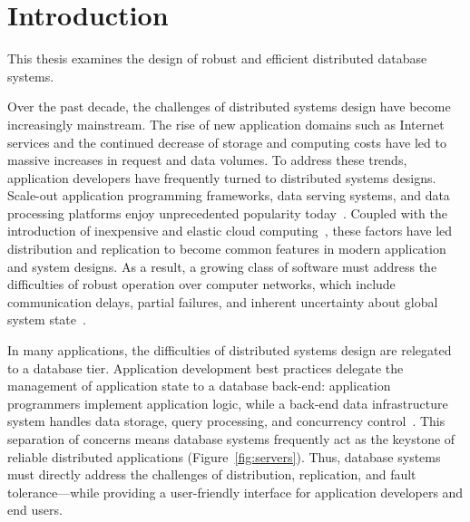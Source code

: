 \chapter{Introduction}
\label{c.intro}

This thesis examines the design of robust and efficient distributed
database systems.

Over the past decade, the challenges of distributed systems design
have become increasingly mainstream. The rise of new application
domains such as Internet services and the continued decrease of
storage and computing costs have led to massive increases in request
and data volumes. To address these trends, application developers have
frequently turned to distributed systems designs. Scale-out
application programming frameworks, data serving systems, and data
processing platforms enjoy unprecedented popularity
today~\cite{mohan-note,queue,fnt-mr}. Coupled with the introduction of
inexpensive and elastic cloud computing~\cite{berkeley-view}, these
factors have led distribution and replication to become common
features in modern application and system designs. As a result, a
growing class of software must address the difficulties of robust
operation over computer networks, which include communication delays,
partial failures, and inherent uncertainty about global system
state~\cite{fallacies-deutsch}.

In many applications, the difficulties of distributed systems design
are relegated to a database tier. Application development best
practices delegate the management of application state to a database
back-end: application programmers implement application logic, while a
back-end data infrastructure system handles data storage, query
processing, and concurrency control~\cite{tamer-book}. This separation
of concerns means database systems frequently act as the keystone of
reliable distributed applications (Figure~\ref{fig:servers}). Thus,
database systems must directly address the challenges of distribution,
replication, and fault tolerance---while providing a user-friendly
interface for application developers and end users.


